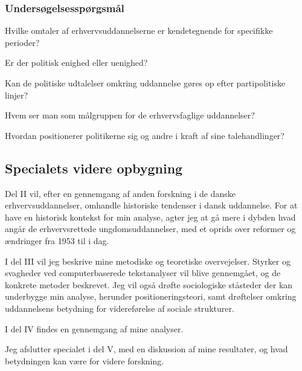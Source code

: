 \subsubsection{Undersøgelsesspørgsmål}
\label{sec:res-qs}

Hvilke omtaler af erhvervsuddannelserne er kendetegnende for specifikke perioder?

Er der politisk enighed eller uenighed?

Kan de politiske udtalelser omkring uddannelse gøres op efter partipolitiske linjer?

Hvem ser man som målgruppen for de erhvervsfaglige uddannelser?

Hvordan positionerer politikerne sig og andre i kraft af sine talehandlinger?

\subsection{Specialets videre opbygning}
\label{sec:structure}

Del II vil, efter en gennemgang af anden forskning i de danske erhvervsuddannelser, omhandle historiske tendenser i dansk uddannelse.
For at have en historisk kontekst for min analyse, agter jeg at gå mere i dybden hvad angår de erhvervsrettede ungdomsuddannelser, med et oprids over reformer og ændringer fra 1953 til i dag.

I del III vil jeg beskrive mine metodiske og teoretiske overvejelser.
Styrker og svagheder ved computerbaserede tekstanalyser vil blive gennemgået, og de konkrete metoder beskrevet.
Jeg vil også drøfte sociologiske ståsteder der kan underbygge min analyse, herunder positioneringsteori, samt drøftelser omkring uddannelsens betydning for videreførelse af sociale strukturer.

I del IV findes en gennemgang af mine analyser.

Jeg afslutter specialet i del V, med en diskussion af mine resultater, og hvad betydningen kan være for videre forskning.
